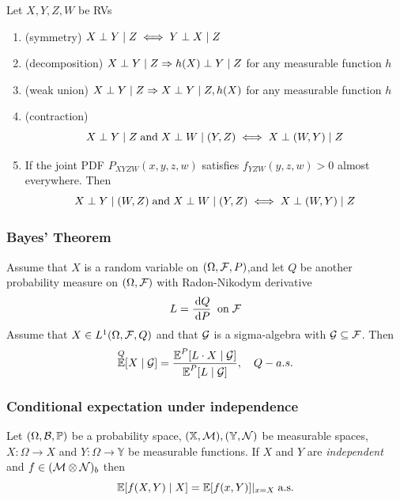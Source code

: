 \documentclass[10pt]{article}
\begin{document}
 Let $X,Y,Z,W$ be RVs 
\begin{enumerate}
    \item (symmetry) $X \perp Y \given Z \iff Y \perp X \given Z$
    \item (decomposition) $X \perp Y \given Z \implies h(X) \perp Y \given Z$ for any measurable function $h$
    \item (weak union) $X \perp Y \given Z \implies X \perp Y \given Z, h(X)$ for any measurable function $h$ 
    \item (contraction) 
    \begin{equation}
        X \perp Y \given Z \mtext{and} X \perp W \given (Y,Z) \iff X \perp (W,Y) \given Z 
    \end{equation}
    \item If the joint PDF $P_{XYZW} (x,y,z,w)$ satisfies $f_{YZW} (y,z,w) >0$ almost everywhere. Then 
    \begin{equation}
        X \perp Y \given (W,Z) \mtext{and} X \perp W \given (Y,Z) \iff X \perp (W,Y) \given Z 
    \end{equation}
\end{enumerate}
\subsubsection{Bayes' Theorem}
Assume that $X$ is a random variable on $(\Omega, \mathcal{F}, P)$,and let $Q$ be another probability measure on $(\Omega, \mathcal{F})$ with Radon-Nikodym derivative 
\begin{equation}
    L = \frac{\,\mathrm{d}Q}{\,\mathrm{d}P} \; \text{\;on\;} \mathcal{F}
\end{equation}
Assume that $X \in L^1(\Omega, \mathcal{F}, Q)$ and that $\mathcal{G}$ is a sigma-algebra with $\mathcal{G} \subseteq \mathcal{F}$. Then 
\begin{equation}
    \E^Q [X \given \cG] = \frac{\E^P[L \cdot X \given \cG]}{\E^P [L \given \cG]}, \quad Q-a.s. 
\end{equation}
\subsubsection{Conditional expectation under independence}
Let $(\Omega, \mathcal{B}, \mathop{\mathbb{P} \displaystyle})$ be a probability space, $(\mathbb{X}, \mathcal{M}), (\mathbb{Y}, \mathcal{N})$ be measurable spaces, $X: \Omega \to X$ and $Y: \Omega \to \mathbb{Y}$ be measurable functions. If $X$ and $Y$ are \emph{independent} and $f \in (\mathcal{M} \otimes \mathcal{N})_b$ then
\begin{equation}
    \E[f(X,Y) \given X] = \E[f(x,Y)] \rvert_{x=X} \; \text{a.s.}
\end{equation}
\end{document}
